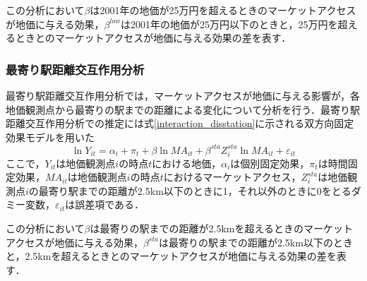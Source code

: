 この分析において$\beta$は2001年の地価が25万円を超えるときのマーケットアクセスが地価に与える効果，$\beta^{low}$は2001年の地価が25万円以下のときと，25万円を超えるときとのマーケットアクセスが地価に与える効果の差を表す．

\subsubsection{最寄り駅距離交互作用分析}
最寄り駅距離交互作用分析では，マーケットアクセスが地価に与える影響が，各地価観測点から最寄りの駅までの距離による変化について分析を行う．最寄り駅距離交互作用分析での推定には式\ref{interaction_disstation}に示される双方向固定効果モデルを用いた
\begin{equation}
  \ln{Y_{it}} = \alpha_{i} + \pi_{t} + \beta\ln{MA_{it}} + \beta^{sta}Z^{sta}_{i}\ln{MA_{it}} + \varepsilon_{it}
  \label{interaction_disstation}
\end{equation}
ここで，$Y_{it}$は地価観測点$i$の時点$t$における地価，$\alpha_{i}$は個別固定効果，$\pi_{t}$は時間固定効果，$MA_{it}$は地価観測点$i$の時点$t$におけるマーケットアクセス，$Z^{sta}_{i}$は地価観測点$i$の最寄り駅までの距離が2.5km以下のときに1，それ以外のときに0をとるダミー変数，$\varepsilon_{it}$は誤差項である．

この分析において$\beta$は最寄りの駅までの距離が2.5kmを超えるときのマーケットアクセスが地価に与える効果，$\beta^{sta}$は最寄りの駅までの距離が2.5km以下のときと，2.5kmを超えるときとのマーケットアクセスが地価に与える効果の差を表す．
